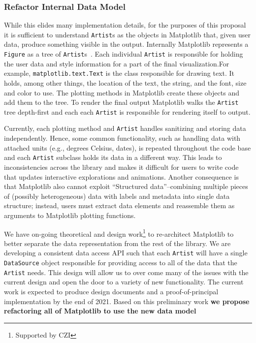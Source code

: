 \documentclass[12pt]{article}
\numberwithin{page}{section}
\begin{document}
\subsubsection{Refactor Internal Data Model}

While this elides many implementation details, for the purposes of
this proposal it is sufficient to understand \texttt{Artist}s as the
objects in Matplotlib that, given user data, produce something visible
in the output.  Internally Matplotlib represents a \texttt{Figure} as
a tree of \texttt{Artist}s~\cite{AOSA_mpl}.  Each individual
\texttt{Artist} is responsible for holding the user data and style
information for a part of the final visualization.For example,
\texttt{matplotlib.text.Text} is the class responsible for drawing
text.  It holds, among other things, the location of the text, the
string, and the font, size and color to use.  The plotting methods in
Matplotlib create these objects and add them to the tree.  To render
the final output Matplotlib walks the \texttt{Artist} tree depth-first
and each each \texttt{Artist} is responsible for rendering itself to
output.

Currently, each plotting method and \texttt{Artist} handles sanitizing
and storing data independently.  Hence, some common functionality,
such as handling data with attached units (e.g., degrees Celsius,
dates), is repeated throughout the code base and each \texttt{Artist}
subclass holds its data in a different way.  This leads to
inconsistencies across the library and makes it difficult for users to
write code that updates interactive explorations and animations.
Another consequence is that Matplotlib also cannot exploit
``Structured data''--combining multiple pieces of (possibly
heterogeneous) data with labels and metadata into single data
structure; instead, users must extract data elements and reassemble
them as arguments to Matplotlib plotting functions.

We have on-going theoretical and design work\footnote{Supported by
CZI} to re-architect Matplotlib to better separate the data
representation from the rest of the library.  We are developing a
consistent data access API such that each \texttt{Artist} will have a
single \texttt{DataSource} object responsible for providing access to
all of the data that the \texttt{Artist} needs.  This design will
allow us to over come many of the issues with the current design and
open the door to a variety of new functionality.  The current work is
expected to produce design documents and a proof-of-principal
implementation by the end of 2021.  Based on this preliminary work
\textbf{we propose refactoring all of Matplotlib to use the new data
  model}
\end{document}
